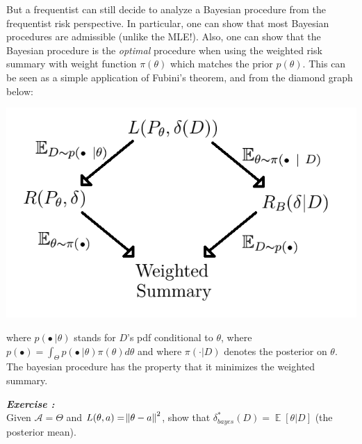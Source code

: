 \documentclass[12pt]{report}
\DeclareMathOperator{\E}{\mathbb{E}}
\begin{document}
\begin{enumerate}[A)]
But a frequentist can still decide to analyze a Bayesian procedure from the frequentist risk perspective. In particular, one can show that most Bayesian procedures are admissible (unlike the MLE!). Also, one can show that the Bayesian procedure is the \textit{optimal} procedure when using the weighted risk summary with weight function $\pi(\theta)$ which matches the prior $p(\theta)$. This can be seen as a simple application of Fubini's theorem, and from the diamond graph below: \\
\centerline{\includegraphics[scale=0.5]{graph_2.png}}
where $p(\bullet\ | \theta)$ stands for $D$'s pdf conditional to  $\theta$, where $p(\bullet) = \int_{\Theta}^{}p(\bullet\ | \theta)\pi(\theta )d\theta$ and where $\pi(\cdot | D)$ denotes the posterior on $\theta$.
The bayesian procedure has the property that it minimizes the weighted summary.

\end{enumerate}

\noindent\textit{\textbf{Exercise :}}\\
Given $\mathcal{A} = \Theta$ and $L(\theta,a)=\norm{\theta-a}^2$, show that $\delta_{bayes}^{*}(D) = \E[\theta|D]$ (the posterior mean).
\end{document}
